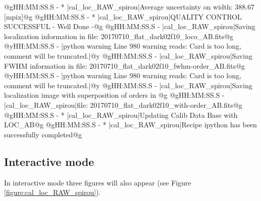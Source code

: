 \begin{cmdboxprintspecial}[fontupper=\tiny, fontlower=\tiny]
@gHH:MM:SS.S - * |cal_loc_RAW_spirou|Average uncertainty on width: 388.67 [mpix]@g
@gHH:MM:SS.S - * |cal_loc_RAW_spirou|QUALITY CONTROL SUCCESSFUL - Well Done -@g
@gHH:MM:SS.S -   |cal_loc_RAW_spirou|Saving localization information in file: 20170710_flat_dark02f10_loco_AB.fits@g
@yHH:MM:SS.S - \@ |python warning Line 980  warning reads: Card is too long, comment will be truncated.|@y
@gHH:MM:SS.S -   |cal_loc_RAW_spirou|Saving FWHM information in file: 20170710_flat_dark02f10_fwhm-order_AB.fits@g
@yHH:MM:SS.S - \@ |python warning Line 980  warning reads: Card is too long, comment will be truncated.|@y
@gHH:MM:SS.S -   |cal_loc_RAW_spirou|Saving localization image with superposition of orders in @g
@gHH:MM:SS.S -   |cal_loc_RAW_spirou|file: 20170710_flat_dark02f10_with-order_AB.fits@g
@gHH:MM:SS.S - * |cal_loc_RAW_spirou|Updating Calib Data Base with LOC_AB@g
@gHH:MM:SS.S - * |cal_loc_RAW_spirou|Recipe ipython has been successfully completed@g
\end{cmdboxprintspecial}


\newpage
\subsection{Interactive mode}

\noindent In interactive mode three figures will also appear (see Figure \ref{figure:cal_loc_RAW_spirou}).

